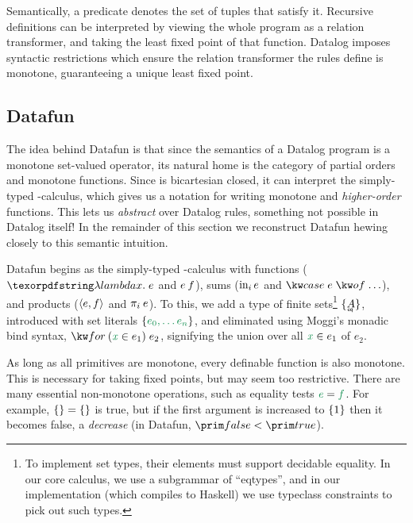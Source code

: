 Semantically, a predicate denotes the set of tuples that satisfy it. Recursive
definitions can be interpreted by viewing the whole program as a relation
transformer, and taking the least fixed point of that function. Datalog imposes
syntactic restrictions which ensure the relation transformer the rules define is
monotone, guaranteeing a unique least fixed point.

\subsection{Datafun}




The idea behind Datafun is that since the semantics of a Datalog program
is a monotone set-valued operator, its natural home is the category
\Poset{} of partial orders and monotone functions. Since \Poset{} is
bicartesian closed, it can interpret the simply-typed \fn-calculus,
which gives us a notation for writing monotone and \emph{higher-order}
functions.
%
This lets us \emph{abstract} over Datalog rules, something not
possible in Datalog itself!
%
In the remainder of this section we reconstruct Datafun hewing closely
to this semantic intuition.

Datafun begins as the simply-typed \fn-calculus with functions ($\fnof
x e$ and $e\<f$), sums ($\mathrm{in}_{i}\, e$ and $\ecase{e}{\dots}$), and
products ($\langle{e,f}\rangle$ and $\pi_i\<e$). To this, we add a type of
finite sets\footnote{To implement set types, their elements must
  support decidable equality. In our core calculus, we use a
  subgrammar of ``eqtypes'', and in our implementation (which compiles
  to Haskell) we use typeclass constraints to pick out such types.}
$\tset{\eqt A}$, introduced with set literals $\eset{e_0, \ldots
  e_n}$, and eliminated using Moggi's monadic bind syntax,
$\efor{x}{e_1}{e_2}$, signifying the union over all $\dvar x \in e_1$
of $e_2$.

As long as all primitives are monotone, every definable function is also
monotone. This is necessary for taking fixed points, but may seem too
restrictive. There are many essential non-monotone operations, such as equality
tests $\eeq e f$. For example, $\eset{} = \eset{}$ is true, but if the first
argument is increased to $\{{1}\}$ then it becomes false, a \emph{decrease}
(in Datafun, $\efalse < \etrue$).

